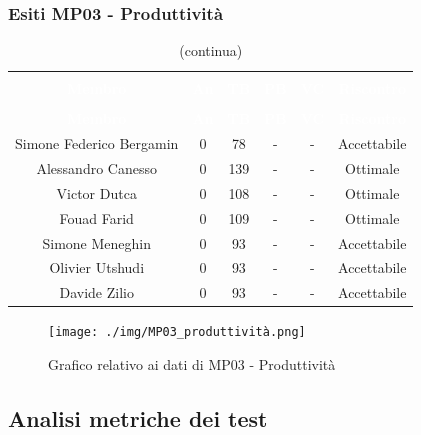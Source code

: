 \subsubsection{Esiti MP03 - Produttività} 
\begin{longtable}{c c c c c c}
\rowcolor{white}\caption{Esiti della Produttività} \\
		\rowcolor{redafk}
\textcolor{white}{\textbf{Membro}} &
\textcolor{white}{\textbf{An}} &
\textcolor{white}{\textbf{TB}} &
\textcolor{white}{\textbf{PB}} &
\textcolor{white}{\textbf{VC}} &
\textcolor{white}{\textbf{Riscontro}} \\
		\endfirsthead
		\rowcolor{white}\caption[]{(continua)} \\
		\rowcolor{redafk}
		\textcolor{white}{\textbf{Membro}} &
\textcolor{white}{\textbf{An}} &
\textcolor{white}{\textbf{TB}} &
\textcolor{white}{\textbf{PB}} &
\textcolor{white}{\textbf{VC}} &
\textcolor{white}{\textbf{Riscontro}} \\
		\endhead
Simone Federico Bergamin & 0 & 78 & - & - & Accettabile\\
Alessandro Canesso & 0 & 139 & - & - & Ottimale \\
Victor Dutca & 0 & 108 & - & - & Ottimale \\
Fouad Farid & 0 & 109 & - & - & Ottimale \\
Simone Meneghin & 0 & 93 & - & - & Accettabile\\
Olivier Utshudi & 0 & 93 & - & - & Accettabile\\
Davide Zilio & 0 & 93 & - & - & Accettabile
\end{longtable}

\begin{figure}[H]
\centering
\texttt{[image: ./img/MP03\_produttività.png]}
\caption{Grafico relativo ai dati di MP03 - Produttività}
\end{figure}

\subsection{Analisi metriche dei test}
